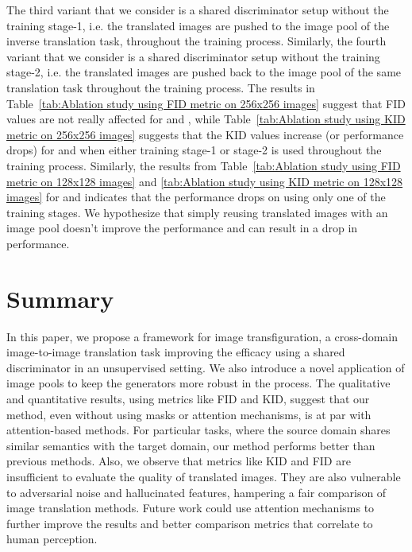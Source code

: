 \documentclass[a4paper,twoside]{article}
\begin{document}
The third variant that we consider is a shared discriminator setup without the training stage-1, i.e. the translated images are pushed to the image pool of the inverse translation task, throughout the training process. Similarly, the fourth variant that we consider is a shared discriminator setup without the training stage-2, i.e. the translated images are pushed back to the image pool of the same translation task throughout the training process. The results in Table~\ref{tab:Ablation study using FID metric on 256x256 images} suggest that FID values are not really affected for \textit{} and \textit{}, while
Table~\ref{tab:Ablation study using KID metric on 256x256 images} suggests that the KID values increase (or performance drops) for \textit{} and \textit{} when either training stage-1 or stage-2 is used throughout the training process. Similarly, the results from Table~\ref{tab:Ablation study using FID metric on 128x128 images} and \ref{tab:Ablation study using KID metric on 128x128 images} for \textit{} and \textit{} indicates that the performance drops on using only one of the training stages. We hypothesize that simply reusing translated images with an image pool doesn't improve the performance and can result in a drop in performance.
\section{Summary}
\label{Summary}
\noindent
In this paper, we propose a framework for image transfiguration, a cross-domain image-to-image translation task improving the efficacy using a shared discriminator in an unsupervised setting. We also introduce a novel application of image pools to keep the generators more robust in the process. The qualitative and quantitative results, using metrics like FID and KID, suggest that our method, even without using masks or attention mechanisms, is at par with attention-based methods. For particular tasks, where the source domain shares similar semantics with the target domain, our method performs better than previous methods. Also, we observe that metrics like KID and FID are insufficient to evaluate the quality of translated images. They are also vulnerable to adversarial noise and hallucinated features, hampering a fair comparison of image translation methods. Future work could use attention mechanisms to further improve the results and better comparison metrics that correlate to human perception.

{\small
}
\end{document}
